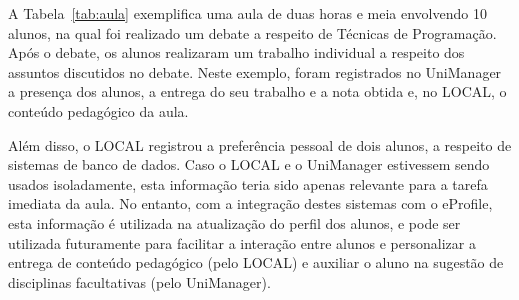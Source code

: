 
A Tabela~\ref{tab:aula} exemplifica uma aula de duas horas e meia envolvendo 10 alunos, na qual foi realizado um debate a respeito de Técnicas de Programação. Após o debate, os alunos realizaram um trabalho individual a respeito dos assuntos discutidos no debate. Neste exemplo, foram registrados no UniManager a presença dos alunos, a entrega do seu trabalho e a nota obtida e, no LOCAL, o conteúdo pedagógico da aula.

Além disso, o LOCAL registrou a preferência pessoal de dois alunos, a respeito de sistemas de banco de dados. Caso o LOCAL e o UniManager estivessem sendo usados isoladamente, esta informação teria sido apenas relevante para a tarefa imediata da aula. No entanto, com a integração destes sistemas com o eProfile, esta informação é utilizada na atualização do perfil dos alunos, e pode ser utilizada futuramente para facilitar a interação entre alunos e personalizar a entrega de conteúdo pedagógico (pelo LOCAL) e auxiliar o aluno na sugestão de disciplinas facultativas (pelo UniManager).

